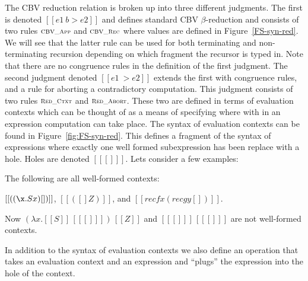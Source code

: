 The CBV reduction relation is broken up into three different
judgments.  The first is denoted $[[e1 ~b> e2]]$ and defines standard
CBV $\beta$-reduction and consists of two rules
$\scriptsize \textsc{CBV\_App}$ and $\scriptsize \textsc{CBV\_Rec}$ where values are
defined in Figure~\ref{FS-syn-red}.  We will see that the latter rule
can be used for both terminating and non-terminating recursion
depending on which fragment the recursor is typed in.  Note that there
are no congruence rules in the definition of the first judgment.  The
second judgment denoted $[[e1 ~> e2]]$ extends the first with
congruence rules, and a rule for aborting a contradictory computation.
This judgment consists of two rules $\scriptsize \textsc{Red\_Ctxt}$ and
$\scriptsize \textsc{Red\_Abort}$.  These two are defined in terms of
evaluation contexts which can be thought of as a means of specifying
where with in an expression computation can take place. The syntax of
evaluation contexts can be found in Figure~\ref{fig:FS-syn-red}.  This
defines a fragment of the syntax of expressions where exactly one well
formed subexpression has been replace with a hole.  Holes are denoted
$[[ [] ]]$. Lets consider a few examples:
\begin{example}
  \label{ex:FS-WF-ECTX}
  The following are all well-formed contexts:
  \begin{center}
    $[[((\x.S x) []) ]]$, $[[ ([] Z)]]$, and $[[rec f x (rec g y [])]]$.
  \end{center}
  Now $(\lambda x.[[S]]\,[[ [] ]])\,[[Z]]$ and $[[ [] ]]\,[[ [] ]]$
  are not well-formed contexts.
\end{example}
\noindent
In addition to the syntax of evaluation contexts we also define an
operation that takes an evaluation context and an expression and
``plugs'' the expression into the hole of the context.  

